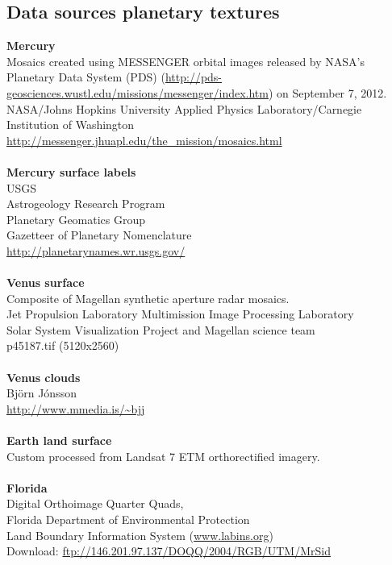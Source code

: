 \documentclass[Orbiter User Manual.tex]{subfiles}
\begin{document}
\subsection{Data sources planetary textures}
\textbf{Mercury}\\
Mosaics created using MESSENGER orbital images released by NASA's Planetary Data System (PDS) (\url{http://pds-geosciences.wustl.edu/missions/messenger/index.htm}) on September 7, 2012.\\
NASA/Johns Hopkins University Applied Physics Laboratory/Carnegie Institution of Washington\\
\url{http://messenger.jhuapl.edu/the_mission/mosaics.html}\\
\\
\textbf{Mercury surface labels}\\
USGS\\
Astrogeology Research Program\\
Planetary Geomatics Group\\
Gazetteer of Planetary Nomenclature\\
\url{http://planetarynames.wr.usgs.gov/}\\
\\
\textbf{Venus surface}\\
Composite of Magellan synthetic aperture radar mosaics.\\
Jet Propulsion Laboratory Multimission Image Processing Laboratory\\
Solar System Visualization Project and Magellan science team\\
p45187.tif (5120x2560)\\
\\
\textbf{Venus clouds}\\
Björn Jónsson\\
\url{http://www.mmedia.is/~bjj}\\
\\
\textbf{Earth land surface}\\
Custom processed from Landsat 7 ETM orthorectified imagery.\\
\\
\textbf{Florida}\\
Digital Orthoimage Quarter Quads,\\
Florida Department of Environmental Protection\\
Land Boundary Information System (\url{www.labins.org})\\
Download: \url{ftp://146.201.97.137/DOQQ/2004/RGB/UTM/MrSid}\\
\\
\end{document}
